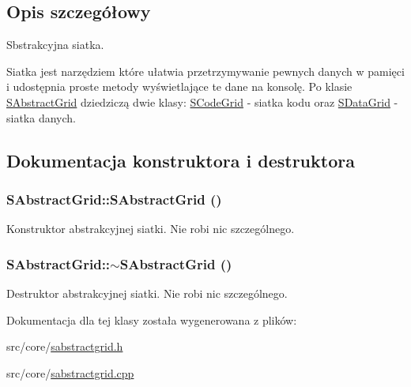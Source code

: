 \subsection{Opis szczegółowy}
Sbstrakcyjna siatka. 

Siatka jest narzędziem które ułatwia przetrzymywanie pewnych danych w pamięci i udostępnia proste metody wyświetlające te dane na konsolę. Po klasie \hyperlink{classSAbstractGrid}{SAbstractGrid} dziedziczą dwie klasy: \hyperlink{classSCodeGrid}{SCodeGrid} - siatka kodu oraz \hyperlink{classSDataGrid}{SDataGrid} - siatka danych. 

\subsection{Dokumentacja konstruktora i destruktora}
\hypertarget{classSAbstractGrid_2df5b6a5bd2a11d9015104f3dd6afc20}{
\subsubsection[{SAbstractGrid}]{\setlength{\rightskip}{0pt plus 5cm}SAbstractGrid::SAbstractGrid ()}}
\label{classSAbstractGrid_2df5b6a5bd2a11d9015104f3dd6afc20}


Konstruktor abstrakcyjnej siatki. Nie robi nic szczególnego. \hypertarget{classSAbstractGrid_7391180cba323fbd0d64d23157c8a6a6}{
\subsubsection[{$\sim$SAbstractGrid}]{\setlength{\rightskip}{0pt plus 5cm}SAbstractGrid::$\sim$SAbstractGrid ()}}
\label{classSAbstractGrid_7391180cba323fbd0d64d23157c8a6a6}


Destruktor abstrakcyjnej siatki. Nie robi nic szczególnego. 

Dokumentacja dla tej klasy została wygenerowana z plików:\begin{CompactItemize}
\item 
src/core/\hyperlink{sabstractgrid_8h}{sabstractgrid.h}\item 
src/core/\hyperlink{sabstractgrid_8cpp}{sabstractgrid.cpp}\end{CompactItemize}
